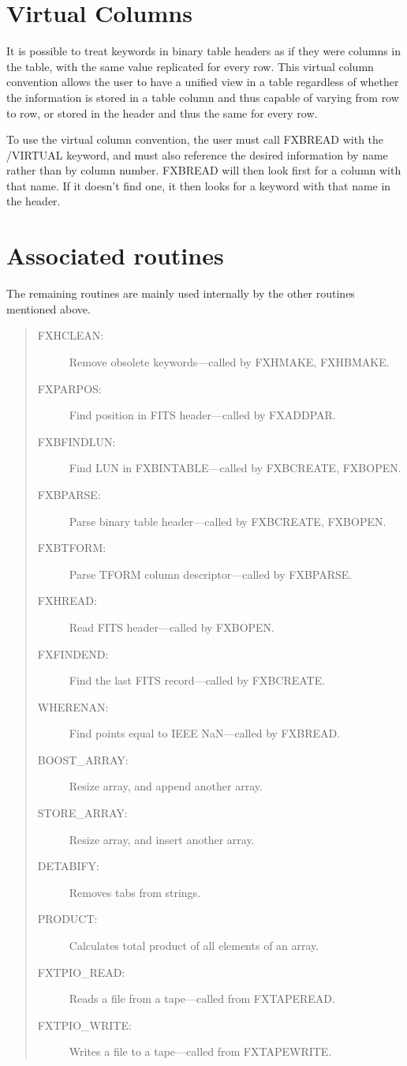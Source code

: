 \section{Virtual Columns}

It is possible to treat keywords in binary table headers as if they were
columns in the table, with the same value replicated for every row.  This
virtual column convention allows the user to have a unified view in a table
regardless of whether the information is stored in a table column and thus
capable of varying from row to row, or stored in the header and thus the same
for every row.

To use the virtual column convention, the user must call FXBREAD with the
/VIRTUAL keyword, and must also reference the desired information by name
rather than by column number.  FXBREAD will then look first for a column with
that name.  If it doesn't find one, it then looks for a keyword with that name
in the header.

\section{Associated routines}

The remaining routines are mainly used internally by the other routines
mentioned above.
\begin{quote}
\begin{description}
\item[FXHCLEAN:]
Remove obsolete keywords---called by FXHMAKE, FXHBMAKE.
\item[FXPARPOS:]
Find position in FITS header---called by FXADDPAR.
\item[FXBFINDLUN:]
Find LUN in FXBINTABLE---called by FXBCREATE, FXBOPEN.
\item[FXBPARSE:]
Parse binary table header---called by FXBCREATE, FXBOPEN.
\item[FXBTFORM:]
Parse TFORM column descriptor---called by FXBPARSE.
\item[FXHREAD:]
Read FITS header---called by FXBOPEN.
\item[FXFINDEND:]
Find the last FITS record---called by FXBCREATE.
\item[WHERENAN:]
Find points equal to IEEE NaN---called by FXBREAD.
\item[BOOST\_ARRAY:]
Resize array, and append another array.
\item[STORE\_ARRAY:]
Resize array, and insert another array.
\item[DETABIFY:]
Removes tabs from strings.
\item[PRODUCT:]
Calculates total product of all elements of an array.
\item[FXTPIO\_READ:]
Reads a file from a tape---called from FXTAPEREAD.
\item[FXTPIO\_WRITE:]
Writes a file to a tape---called from FXTAPEWRITE.
\end{description}
\end{quote}

